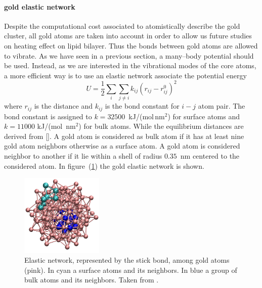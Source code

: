 \paragraph{\textbf{gold elastic network}} Despite the computational cost associated to atomistically describe the gold cluster, all gold atoms are taken into account in order to allow us future studies on heating effect on lipid bilayer. Thus the bonds between gold atoms are allowed to vibrate. As we have seen in a previous section, a many--body potential should be used. Instead, as we are interested in the vibrational modes of the core atoms, 
a more efficient way is to use an elastic network associate the potential energy
\begin{equation*}
	U = \frac{1}{2}\sum_i \sum_{j\ne i}k_{ij}(r_{ij} - r_{ij}^0)^2
\end{equation*}
where $r_{ij}$ is the distance and $k_{ij}$ is the bond constant for $i-j$ atom pair. 
The bond constant is assigned to $k = 32500$~kJ/(mol\,nm$^2$) for surface atoms and $k = 11000$ kJ/(mol\ nm$^2$) for bulk atoms. While the equilibrium distances are derived from []. A gold atom is considered as bulk atom if it has at least nine gold atom neighbors otherwise as a surface atom. A gold atom is considered neighbor to another if it lie within a shell of radius $0.35$~nm centered to the considered atom. In figure~(\ref{fig:goldNetwork}) the gold elastic network is shown.
\begin{figure}
	\centering
	\includegraphics[width=0.35\textwidth]{./img/goldNetwork}
	\caption{Elastic network, represented by the stick bond, among gold atoms (pink). In cyan a surface atoms and its neighbors. In blue a group of bulk atoms and its neighbors. Taken from \cite{simonelliThesis}.}
	\label{fig:goldNetwork}
\end{figure}

